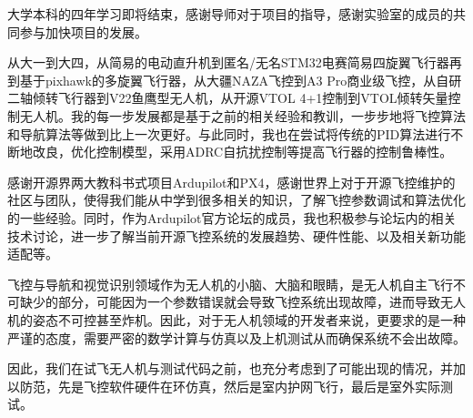 \begin{thanksfor}
大学本科的四年学习即将结束，感谢导师对于项目的指导，感谢实验室的成员的共同参与加快项目的发展。

从大一到大四，从简易的电动直升机到匿名/无名STM32电赛简易四旋翼飞行器再到基于pixhawk的多旋翼飞行器，从大疆NAZA飞控到A3 Pro商业级飞控，从自研二轴倾转飞行器到V22鱼鹰型无人机，从开源VTOL 4+1控制到VTOL倾转矢量控制无人机。我的每一步发展都是基于之前的相关经验和教训，一步步地将飞控算法和导航算法等做到比上一次更好。与此同时，我也在尝试将传统的PID算法进行不断地改良，优化控制模型，采用ADRC自抗扰控制等提高飞行器的控制鲁棒性。

感谢开源界两大教科书式项目Ardupilot和PX4，感谢世界上对于开源飞控维护的社区与团队，使得我们能从中学到很多相关的知识，了解飞控参数调试和算法优化的一些经验。同时，作为Ardupilot官方论坛的成员，我也积极参与论坛内的相关技术讨论，进一步了解当前开源飞控系统的发展趋势、硬件性能、以及相关新功能适配等。

飞控与导航和视觉识别领域作为无人机的小脑、大脑和眼睛，是无人机自主飞行不可缺少的部分，可能因为一个参数错误就会导致飞控系统出现故障，进而导致无人机的姿态不可控甚至炸机。因此，对于无人机领域的开发者来说，更要求的是一种严谨的态度，需要严密的数学计算与仿真以及上机测试从而确保系统不会出故障。

因此，我们在试飞无人机与测试代码之前，也充分考虑到了可能出现的情况，并加以防范，先是飞控软件硬件在环仿真，然后是室内护网飞行，最后是室外实际测试。
\end{thanksfor}
